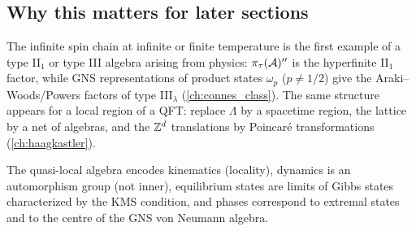 \subsection{Why this matters for later sections}

The infinite spin chain at infinite or finite temperature is the first example of a type II$_1$ or type III algebra arising from physics: $\pi_\tau(\mathcal{A})''$ is the hyperfinite II$_1$ factor, while GNS representations of product states $\omega_p$ ($p\neq1/2$) give the Araki--Woods/Powers factors of type III$_\lambda$ (\cref{ch:connes_class}). The same structure appears for a local region of a QFT: replace $\Lambda$ by a spacetime region, the lattice by a net of algebras, and the $\mathbb{Z}^d$ translations by Poincar\'e transformations (\cref{ch:haagkastler}).

\begin{keyidea}
The quasi-local algebra encodes kinematics (locality), dynamics is an automorphism group (not inner), equilibrium states are limits of Gibbs states characterized by the KMS condition, and phases correspond to extremal states and to the centre of the GNS von Neumann algebra.
\end{keyidea}

